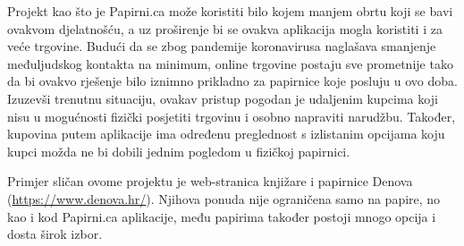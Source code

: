 		
		\noindent \normalsize{Projekt kao što je Papirni.ca  može koristiti bilo kojem manjem obrtu koji se bavi ovakvom djelatnošću, a uz proširenje bi se ovakva aplikacija mogla koristiti i za veće trgovine. Budući da se zbog pandemije koronavirusa naglašava smanjenje međuljudskog kontakta na minimum, online trgovine postaju sve prometnije tako da bi ovakvo rješenje bilo iznimno prikladno za papirnice koje posluju u ovo doba. Izuzevši trenutnu situaciju, ovakav pristup pogodan je udaljenim kupcima koji nisu u mogućnosti fizički posjetiti trgovinu i osobno napraviti narudžbu. Također, kupovina putem aplikacije ima određenu preglednost s izlistanim opcijama  koju kupci možda ne bi dobili jednim pogledom u fizičkoj papirnici.} 
		
		\noindent \normalsize{Primjer sličan ovome projektu je web-stranica  knjižare i papirnice Denova (\url{https://www.denova.hr/}). Njihova ponuda nije ograničena samo na papire, no kao i kod Papirni.ca aplikacije, među papirima također postoji mnogo opcija i dosta širok izbor.} \\
		
	
	
		
		 	
	
